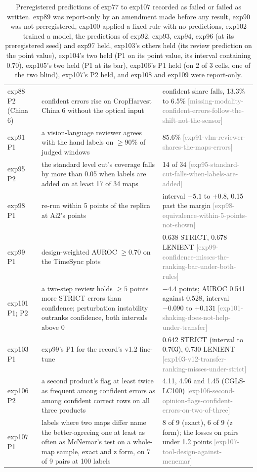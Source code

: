 \documentclass[11pt,a4paper]{article}
\newcommand{\claim}[1]{{\scriptsize\textsf{\textcolor{gray}{[#1]}}}}
\begin{document}
\begin{table}[h]
\begin{tabularx}{\linewidth}{@{}lXX@{}}
exp88 P2 (China 6) & confident errors rise on CropHarvest China 6 without the optical input & confident share falls, 13.3\% to 6.5\% \claim{missing-modality-confident-errors-follow-the-shift-not-the-sensor} \\
exp91 P1 & a vision-language reviewer agrees with the hand labels on $\geq 90\%$ of judged windows & 85.6\% \claim{exp91-vlm-reviewer-shares-the-maps-errors} \\
exp95 P2 & the standard level cut's coverage falls by more than 0.05 when labels are added on at least 17 of 34 maps & 14 of 34 \claim{exp95-standard-cut-falls-when-labels-are-added} \\
exp98 P1 & re-run within 5 points of the replica at Ai2's points & interval $-5.1$ to $+0.8$, 0.15 past the margin \claim{exp98-equivalence-within-5-points-not-shown} \\
exp99 P1 & design-weighted AUROC $\ge 0.70$ on the TimeSync plots & 0.638 STRICT, 0.678 LENIENT \claim{exp99-confidence-misses-the-ranking-bar-under-both-rules} \\
exp101 P1; P2 & a two-step review holds $\ge 5$ points more STRICT errors than confidence; perturbation instability outranks confidence, both intervals above 0 & $-4.4$ points; AUROC 0.541 against 0.528, interval $-0.090$ to $+0.131$ \claim{exp101-shaking-does-not-help-under-transfer} \\
exp103 P1 & exp99's P1 for the record's v1.2 fine-tune & 0.642 STRICT (interval to 0.703), 0.730 LENIENT \claim{exp103-v12-transfer-ranking-misses-under-strict} \\
exp106 P2 & a second product's flag at least twice as frequent among confident errors as among confident correct rows on all three products & 4.11, 4.96 and 1.45 (CGLS-LC100) \claim{exp106-second-opinion-flags-confident-errors-on-two-of-three} \\
exp107 P1 & labels where two maps differ name the better-agreeing one at least as often as McNemar's test on a whole-map sample, exact and z form, on 7 of 9 pairs at 100 labels & 8 of 9 (exact), 6 of 9 (z form); the losses on pairs under 1.2 points \claim{exp107-tool-design-against-mcnemar} \\
\bottomrule
\end{tabularx}
\caption{Preregistered predictions of exp77 to exp107 recorded as failed or failed as written. exp89 was report-only by
an amendment made before any result, exp90 was not preregistered, exp100 applied a fixed rule with no predictions,
exp102 trained a model, the predictions of exp92, exp93, exp94, exp96 (at its preregistered seed) and exp97 held,
exp103's others held (its review prediction on the point value), exp104's two held (P1 on its point value, its interval
containing 0.70), exp105's two held (P1 at its bar), exp106's P1 held (on 2 of 3 cells, one of the two blind),
exp107's P2 held, and exp108 and exp109 were report-only.}
\label{tab:failed}
\end{table}
\end{document}
